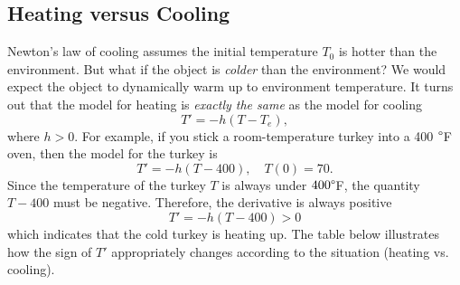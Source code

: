 \documentclass[10pt,letterpaper]{article}
\begin{document}




\subsection{Heating versus Cooling}

Newton's law of cooling assumes the initial temperature $T_0$ is hotter than the environment. But what if the object is \textit{colder} than the environment? We would expect the object to dynamically warm up to environment temperature. It turns out that the model for heating is \textit{exactly the same} as the model for cooling
\[
T' = -h(T - T_e),
\]
where $h>0$. For example, if you stick a room-temperature turkey into a 400 $\degree$F oven, then the model for the turkey is 
$$
T' = -h(T-400), \quad T(0)=70.
$$
Since the temperature of the turkey $T$ is always under $400\degree$F, the quantity $T-400$ must be negative. Therefore, the derivative is always positive
$$
T'=-h(T-400) > 0
$$
which indicates that the cold turkey is heating up. The table below illustrates how the sign of $T'$ appropriately changes according to the situation (heating vs. cooling).
\end{document}
